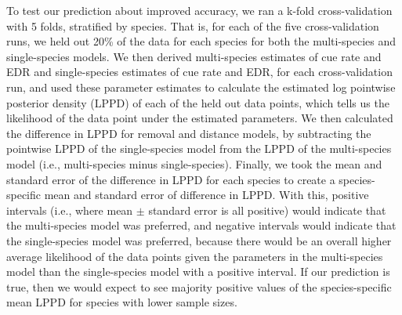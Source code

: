 \documentclass[12pt]{article}
\begin{document}
\par To test our prediction about improved accuracy, we ran a k-fold cross-validation with 5 folds, stratified by species.
That is, for each of the five cross-validation runs, we held out 20\% of the data for each species for both the multi-species and single-species models. 
We then derived multi-species estimates of cue rate and EDR and single-species estimates of cue rate and EDR, for each cross-validation run, and used these parameter estimates to calculate the estimated log pointwise posterior density (LPPD) of each of the held out data points, which tells us the likelihood of the data point under the estimated parameters.
We then calculated the difference in LPPD for removal and distance models, by subtracting the pointwise LPPD of the single-species model from the LPPD of the multi-species model (i.e., multi-species minus single-species).
Finally, we took the mean and standard error of the difference in LPPD for each species to create a species-specific mean and standard error of difference in LPPD.
With this, positive intervals (i.e., where mean $\pm$ standard error is all positive) would indicate that the multi-species model was preferred, and negative intervals would indicate that the single-species model was preferred, because there would be an overall higher average likelihood of the data points given the parameters in the multi-species model than the single-species model with a positive interval.
If our prediction is true, then we would expect to see majority positive values of the species-specific mean LPPD for species with lower sample sizes.
\end{document}
